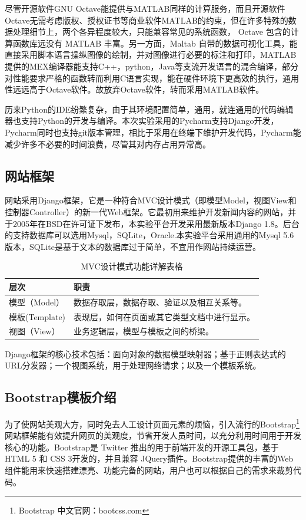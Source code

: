 \documentclass[oneside]{ZJUthesis}
\begin{document}
尽管开源软件GNU Octave能提供与MATLAB同样的计算服务，而且开源软件Octave无需考虑版权、授权证书等商业软件MATLAB的约束，但在许多特殊的数据处理细节上，两个各异程度较大，只能兼容常见的系统函数， Octave 包含的计算函数库远没有 MATLAB 丰富。另一方面，Maltab 自带的数据可视化工具，能直接采用脚本语言操纵图像的绘制，并对图像进行必要的标注和打印，MATLAB提供的MEX编译器能支持C++，python，Java等支流开发语言的混合编译，部分对性能要求严格的函数转而利用C语言实现，能在硬件环境下更高效的执行，通用性远远高于Octave软件。故放弃Octave软件，转而采用MATLAB软件。

历来Python的IDE纷繁复杂，由于其环境配置简单，通用，就连通用的代码编辑器也支持Python的开发与编译。本次实验采用的Pycharm支持Django开发，Pycharm同时也支持git版本管理，相比于采用在终端下维护开发代码，Pycharm能减少许多不必要的时间浪费，尽管其对内存占用异常高。



\subsection{网站框架}
网站采用Django框架，它是一种符合MVC设计模式（即模型Model，视图View和控制器Controller）的新一代Web框架。它最初用来维护开发新闻内容的网站，并于2005年在BSD在许可证下发布，本实验平台开发采用最新版本Django 1.8。后台的支持数据库可以选用Mysql，SQLite，Oracle.本实验平台采用通用的Mysql 5.6版本，SQLite是基于文本的数据库过于简单，不宜用作网站持续运营。
\begin{longtable}{|l|l |}
\caption{MVC设计模式功能详解表格}\\ 
\hline
层次&职责 \\
\hline
模型（Model）& 数据存取层，数据存取、验证以及相互关系等。\\
\hline
模板(Template) & 表现层，如何在页面或其它类型文档中进行显示。\\
\hline
视图（View）&业务逻辑层，模型与模板之间的桥梁。\\
\hline
\end{longtable}


Django框架的核心技术包括：面向对象的数据模型映射器；基于正则表达式的URL分发器；一个视图系统，用于处理网络请求；以及一个模板系统。

\subsection{Bootstrap模板介绍}
为了使网站美观大方，同时免去人工设计页面元素的烦恼，引入流行的Bootstrap\footnote{Bootstrap 中文官网：bootcss.com}网站框架能有效提升网页的美观度，节省开发人员时间，以充分利用时间用于开发核心的功能。Bootstrap是 Twitter 推出的用于前端开发的开源工具包，基于HTML 5 和 CSS 3开发的，并且兼容 JQuery插件。Bootstrap提供的丰富的Web组件能用来快速搭建漂亮、功能完备的网站，用户也可以根据自己的需求来裁剪代码。
\end{document}
